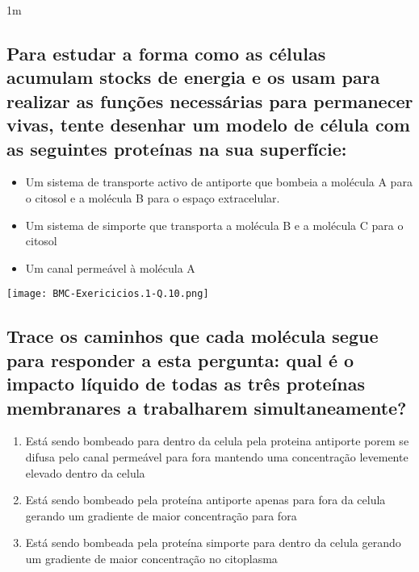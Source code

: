 \documentclass[\mainfilename]{subfiles}
\begin{document}
\begin{questionBox}1m{} %
    
    \subsection*{Para estudar a forma como as células acumulam stocks de energia e os usam para realizar as funções necessárias para permanecer vivas, tente desenhar um modelo de célula com as seguintes proteínas na sua superfície:}

    \begin{itemize}
        \item Um sistema de transporte activo de antiporte que bombeia a molécula A para o citosol e a molécula B para o espaço extracelular.
        \item Um sistema de simporte que transporta a molécula B e a molécula C para o citosol
        \item Um canal permeável à molécula A
    \end{itemize}

    \texttt{[image: BMC-Exericicios.1-Q.10.png]}
        
    \subsection*{Trace os caminhos que cada molécula segue para responder a esta pergunta:
    qual é o impacto líquido de todas as três proteínas membranares a trabalharem simultaneamente?}

    \begin{answerBox}{} %
        \begin{enumerate}[label=\Alph{enumi}:]
            \item Está sendo bombeado para dentro da celula pela proteina antiporte porem se difusa pelo canal permeável para fora mantendo uma concentração levemente elevado dentro da celula
            \item Está sendo bombeado pela proteína antiporte apenas para fora da celula gerando um gradiente de maior concentração para fora
            \item Está sendo bombeada pela proteína simporte para dentro da celula gerando um gradiente de maior concentração no citoplasma
        \end{enumerate}
    \end{answerBox}
        
\end{questionBox}
\end{document}
